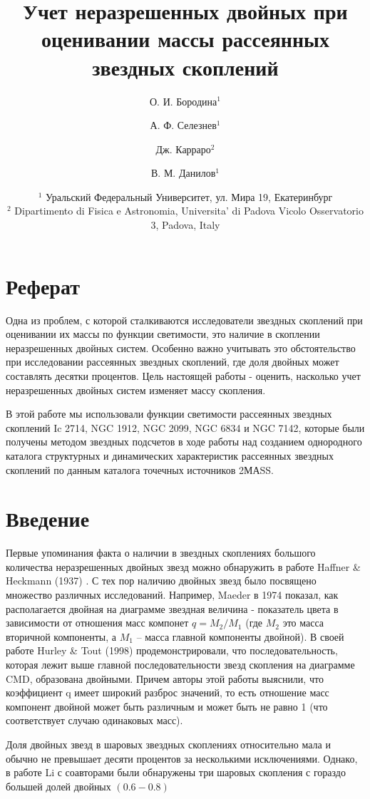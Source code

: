 \documentclass[a4paper,12pt]{article}
\title{Учет неразрешенных двойных при оценивании массы рассеянных звездных скоплений}
\author{О. И. Бородина$^1$ \and А. Ф. Селезнев$^1$ \and Дж. Карраро$^2$ \and В. М. Данилов$^1$ }
\date{\footnotesize{
    $^1$ Уральский Федеральный Университет, ул. Мира 19, Екатеринбург\\%
    $^2$ Dipartimento di Fisica e Astronomia, Universita’ di Padova Vicolo Osservatorio 3, Padova, Italy}\\%
    }
\begin{document}
\maketitle
\section*{Реферат}
Одна из проблем, с которой сталкиваются исследователи звездных скоплений при оценивании их массы по функции светимости, это наличие в скоплении неразрешенных двойных систем. Особенно важно учитывать это обстоятельство при исследовании рассеянных звездных скоплений, где доля двойных может составлять десятки процентов. Цель настоящей работы - оценить, насколько учет неразрешенных двойных систем изменяет массу скопления.
 
В этой работе мы использовали функции светимости рассеянных звездных скоплений Ic 2714, NGC 1912, NGC 2099, NGC 6834 и NGC 7142, которые были получены методом звездных подсчетов в ходе работы над созданием однородного каталога структурных и динамических характеристик рассеянных звездных скоплений по данным каталога точечных источников 2МАSS.

\section*{Введение}
Первые упоминания факта о наличии в звездных скоплениях большого количества неразрешенных двойных звезд можно обнаружить в работе Haffner \& Heckmann (1937) \cite{HH}.
С тех пор наличию двойных звезд было посвящено множество различных исследований. Например, Maeder в 1974 \cite{Maeder} показал, как располагается двойная на диаграмме звездная величина - показатель цвета в зависимости от отношения масс компонет $q=M_2/M_1$ (где $M_2$ это масса вторичной компоненты, а $M_1$ -- масса главной компоненты двойной). В своей работе Hurley \& Tout (1998) \cite{HT} продемонстрировали, что последовательность, которая лежит выше главной последовательности звезд скопления на диаграмме CMD, образована двойными. Причем авторы этой работы выяснили, что коэффициент q имеет широкий разброс значений, то есть отношение масс компонент двойной может быть различным и может быть не равно 1 (что соответствует случаю одинаковых масс). 

Доля двойных звезд в шаровых звездных скоплениях относительно мала и обычно не превышает десяти процентов \cite{Milone2012} за несколькими исключениями. Однако, в работе Li с соавторами \cite{Li17} были обнаружены три шаровых скопления с гораздо большей долей двойных $(0.6-0.8)$
\end{document}
